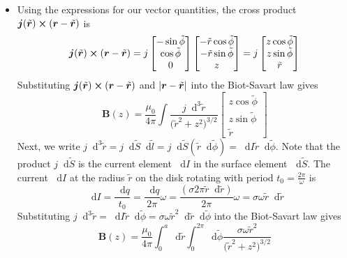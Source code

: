 \documentclass[11pt, a4paper]{article}
\newcommand{\diff}{\mathop{}\!\mathrm{d}} %
\renewcommand{\vec}[1]{\bm{#1}} %
\newcommand{\tvec}[1]{\tilde{\vec{#1}}} %
\renewcommand{\t}[1]{\tilde{#1}} %
\renewcommand{\r}{\vec{r}}
\newcommand{\B}{\vec{B}}  %
\begin{document}
\begin{itemize}
	\item Using the expressions for our vector quantities, the cross product $ \vec{j}(\tvec{r}) \cross (\r - \tvec{r}) $ is
	\begin{equation*}
		\vec{j}(\tvec{r}) \cross (\r - \tvec{r}) = j
		\begin{bmatrix}
			-\sin \t{\phi}\\
			\cos \t{\phi}\\
			0
		\end{bmatrix}
		\begin{bmatrix}
			-\tilde{r} \cos \tilde{\phi}\\
			- \tilde{r} \sin \tilde{\phi}\\
			z
		\end{bmatrix}
		= j
		\begin{bmatrix}
			z \cos \t{\phi}\\
			z \sin \t{\phi}\\
			\t{r}
		\end{bmatrix}
	\end{equation*}
	Substituting $ \vec{j}(\tvec{r}) \cross (\r - \tvec{r}) $ and $  \abs{\r - \tvec{r}} $ into the Biot-Savart law gives
	\begin{equation*}
		\B(z) = \frac{\mu_{0}}{4 \pi} \int \frac{j \diff^{3} \t{r}}{\big(\tilde{r}^{2} + z^{2}\big)^{3/2}} 
		\begin{bmatrix}
			z \cos \t{\phi}\\
			z \sin \t{\phi}\\
			\t{r}
		\end{bmatrix}
	\end{equation*}
	Next, we write $ j \diff^{3}\t{r} = j \diff \t{S} \diff \t{l} = j \diff \t{S} (\t{r} \diff \t{\phi} ) = \diff I \t{r} \diff \t{\phi} $. Note that the product $ j \diff \t{S} $ is the current element $ \diff I $ in the surface element $ \diff \tilde{S} $. The current $ \diff I $ at the radius $ \t{r} $ on the disk rotating with period $ t_{0} = \frac{2\pi}{\omega} $ is
	\begin{equation*}
		\diff I = \frac{\diff q}{t_{0}} = \frac{\diff q}{2\pi} \omega  = \frac{(\sigma 2\pi \t{r}\diff \t r)}{2\pi} \omega = \sigma \omega \t{r} \diff \t{r}
	\end{equation*}
	Substituting $ j \diff^{3}\t{r} =  \diff I \t{r} \diff \t{\phi}  =  \sigma \omega \t{r}^{2} \diff \t{r} \diff \t{\phi}  $ into the Biot-Savart law gives
	\begin{equation*}
		\B(z) = \frac{\mu_{0}}{4 \pi} \int_{0}^{a} \diff \t{r} \int_{0}^{2\pi} \diff \t{\phi}	\frac{\sigma \omega \t{r}^{2}}{\big(\tilde{r}^{2} + z^{2}\big)^{3/2}} 

\end{equation*}
\end{itemize}
\end{document}
